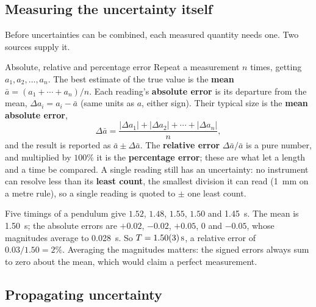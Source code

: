 
\subsection{Measuring the uncertainty itself}

Before uncertainties can be combined, each measured quantity needs one. Two sources supply it.

\begin{defbox}{Absolute, relative and percentage error}
Repeat a measurement $n$ times, getting $a_1,a_2,\ldots,a_n$. The best estimate of the true value is the
\textbf{mean} $\bar a=(a_1+\cdots+a_n)/n$. Each reading's \textbf{absolute error} is its departure from
the mean, $\Delta a_i=a_i-\bar a$ (same units as $a$, either sign). Their typical size is the
\textbf{mean absolute error},
\[
\Delta\bar a=\frac{|\Delta a_1|+|\Delta a_2|+\cdots+|\Delta a_n|}{n},
\]
and the result is reported as $\bar a\pm\Delta\bar a$. The \textbf{relative error} $\Delta\bar a/\bar a$ is a
pure number, and multiplied by $100\%$ it is the \textbf{percentage error}; these are what let a length
and a time be compared. A single reading still has an uncertainty: no instrument can resolve less than
its \textbf{least count}, the smallest division it can read (\SI{1}{mm} on a metre rule), so a single
reading is quoted to $\pm$ one least count.
\end{defbox}

Five timings of a pendulum give $1.52$, $1.48$, $1.55$, $1.50$ and \SI{1.45}{s}. The mean is
\SI{1.50}{s}; the absolute errors are $+0.02$, $-0.02$, $+0.05$, $0$ and $-0.05$, whose magnitudes average
to \SI{0.028}{s}. So $T=\SI{1.50 \pm 0.03}{s}$, a relative error of $0.03/1.50=2\%$. Averaging the
magnitudes matters: the signed errors always sum to zero about the mean, which would claim a perfect
measurement.

\subsection{Propagating uncertainty}\label{sec:propagation}

